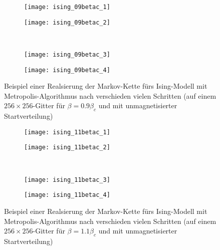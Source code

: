 \documentclass[twoside]{article}
\theoremstyle{definition}
\begin{document}
\begin{figure}
\centering
	\begin{subfigure}[t]{0.49 \textwidth}
	\vskip 0pt
		\centering
		\texttt{[image: ising\_09betac\_1]}
		\caption{}
		\label{fig:ising_09betac_1}		
	\end{subfigure}
	\begin{subfigure}[t]{0.49 \textwidth}
	\vskip 0pt
		\centering
		\texttt{[image: ising\_09betac\_2]}
		\caption{}\label{fig:ising_09betac_2}
	\end{subfigure}\\
		\begin{subfigure}[t]{0.49 \textwidth}
	\vskip 0pt
		\centering
		\texttt{[image: ising\_09betac\_3]}
		\caption{}
		\label{fig:ising_09betac_3}		
	\end{subfigure}
	\begin{subfigure}[t]{0.49 \textwidth}
	\vskip 0pt
		\centering
		\texttt{[image: ising\_09betac\_4]}
		\caption{}	
	\label{fig:ising_09betac_4}
	\end{subfigure}
\caption{Beispiel einer Realsierung der Markov-Kette fürs Ising-Modell mit Metropolis-Algorithmus nach verschieden vielen Schritten (auf einem $256\times 256$-Gitter für $\beta=0.9 \beta_c$ und mit unmagnetisierter Startverteilung)}
\label{fig:ising09}
\end{figure}
\begin{figure}
\centering
	\begin{subfigure}[t]{0.49 \textwidth}
	\vskip 0pt
		\centering
		\texttt{[image: ising\_11betac\_1]}
		\caption{}
		\label{fig:ising_11betac_1}		
	\end{subfigure}
	\begin{subfigure}[t]{0.49 \textwidth}
	\vskip 0pt
		\centering
		\texttt{[image: ising\_11betac\_2]}
		\caption{}\label{fig:ising_11betac_2}
	\end{subfigure}\\
		\begin{subfigure}[t]{0.49 \textwidth}
	\vskip 0pt
		\centering
		\texttt{[image: ising\_11betac\_3]}
		\caption{}
		\label{fig:ising_11betac_3}		
	\end{subfigure}
	\begin{subfigure}[t]{0.49 \textwidth}
	\vskip 0pt
		\centering
		\texttt{[image: ising\_11betac\_4]}
		\caption{}	
	\label{fig:ising_11betac_4}
	\end{subfigure}
\caption{Beispiel einer Realsierung der Markov-Kette fürs Ising-Modell mit Metropolis-Algorithmus nach verschieden vielen Schritten (auf einem $256\times 256$-Gitter für $\beta=1.1 \beta_c$ und mit unmagnetisierter Startverteilung)}
\label{fig:ising11}
\end{figure}
\end{document}
